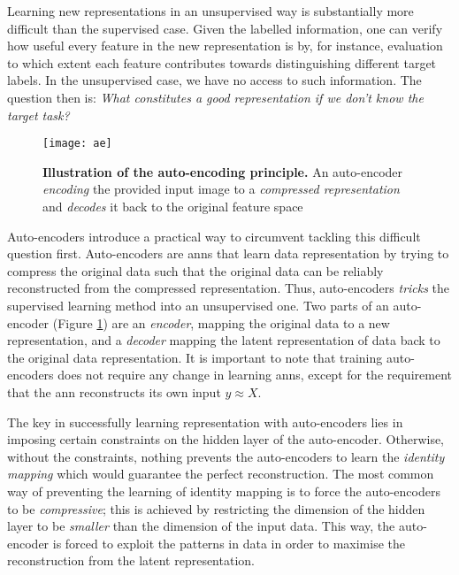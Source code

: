 Learning new representations in an unsupervised way is substantially more difficult than the supervised case.
Given the labelled information, one can verify how useful every feature in the new representation is  by, for instance, evaluation to which extent each feature contributes towards distinguishing different target labels.
In the unsupervised case, we have no access to such information.
The question then is: \textit{What constitutes a good representation if we don't know the target task?}


\begin{figure}
	\centering
	\texttt{[image: ae]}
	\caption[Illustration of the auto-encoding principle]{\textbf{Illustration of the auto-encoding principle.} An auto-encoder \textit{encoding} the provided input image to a \textit{compressed representation} and \textit{decodes} it back to the original feature space}
	\label{fig:ae}
\end{figure}



Auto-encoders introduce a practical way to circumvent tackling this difficult question first.
Auto-encoders are \gls{ann}s that learn data representation by trying to compress the original data such that the original data can be reliably reconstructed from the compressed representation.
Thus, auto-encoders \textit{tricks} the supervised learning method into an unsupervised one.
Two parts of an auto-encoder (Figure \ref{fig:ae}) are an \textit{encoder}, mapping the original data to a new representation, and a \textit{decoder} mapping the latent representation of data back to the original data representation.
It is important to note that training auto-encoders does not require any change in learning \gls{ann}s, except for the requirement that the \gls{ann} reconstructs its own input $y \approx X$.




The key in successfully learning representation with auto-encoders lies in imposing certain constraints on the hidden layer of the auto-encoder.
Otherwise, without the constraints, nothing prevents the auto-encoders to learn the \textit{identity mapping} which would guarantee the perfect reconstruction.
The most common way of preventing the learning of identity mapping is to force the auto-encoders to be \textit{compressive}; this is achieved by restricting the dimension of the hidden layer to be \textit{smaller} than the dimension of the input data.
This way, the auto-encoder is forced to exploit the patterns in data in order to maximise the reconstruction from the latent representation.







